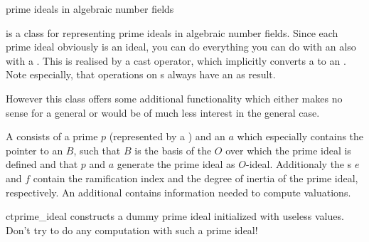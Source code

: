 

\NAME

 \dotfill prime ideals in algebraic number fields


\ABSTRACT

 is a class for representing prime ideals in algebraic number fields.  Since
each prime ideal obviously is an ideal, you can do everything you can do with an
 also with a .  This is realised by a cast operator, which
implicitly converts a  to an .  Note especially, that
operations on s always have an  as result.

However this class offers some additional functionality which either makes no sense for a
general  or would be of much less interest in the general case.



\DESCRIPTION

A  consists of a prime $p$ (represented by a ) and an
 $a$ which especially contains the pointer to an  $B$, such that
$B$ is the basis of the  $O$ over which the prime ideal is defined and that $p$ and
$a$ generate the prime ideal as $O$-ideal.  Additionaly the s $e$ and $f$
contain the ramification index and the degree of inertia of the prime ideal, respectively.  An
additional  contains information needed to compute valuations.



\CONS

\begin{fcode}{ct}{prime_ideal}{}
  constructs a dummy prime ideal initialized with useless values.  Don't try to do any
  computation with such a prime ideal!
\end{fcode}


